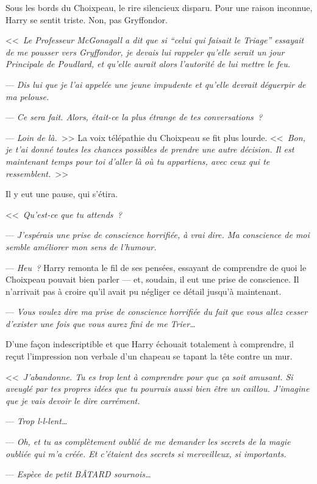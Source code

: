 Sous les bords du Choixpeau, le rire silencieux disparu. Pour une raison inconnue, Harry se sentit triste. Non, pas Gryffondor.

<<~\emph{Le Professeur McGonagall a dit que si “celui qui faisait le Triage” essayait de me pousser vers Gryffondor, je devais lui rappeler qu'elle serait un jour Principale de Poudlard, et qu'elle aurait alors l'autorité de lui mettre le feu.}

--- \emph{Dis lui que je l'ai appelée une jeune impudente et qu'elle devrait déguerpir de ma pelouse.}

--- \emph{Ce sera fait. Alors, était-ce la plus étrange de tes conversations~?}

--- \emph{Loin de là.}~>> La voix télépathie du Choixpeau se fit plus lourde. <<~\emph{Bon, je t'ai donné toutes les chances possibles de prendre une autre décision. Il est maintenant temps pour toi d'aller là où tu appartiens, avec ceux qui te ressemblent.}~>>

Il y eut une pause, qui s'étira.

<<~\emph{Qu'est-ce que tu attends~?}

--- \emph{J'espérais une prise de conscience horrifiée, à vrai dire. Ma conscience de moi semble améliorer mon sens de l'humour.}

--- \emph{Heu~?} Harry remonta le fil de ses pensées, essayant de comprendre de quoi le Choixpeau pouvait bien parler — et, soudain, il eut une prise de conscience. Il n'arrivait pas à croire qu'il avait pu négliger ce détail jusqu'à maintenant.

--- \emph{Vous voulez dire ma prise de conscience horrifiée du fait que vous allez cesser d'exister une fois que vous aurez fini de me Trier…}

D'une façon indescriptible et que Harry échouait totalement à comprendre, il reçut l'impression non verbale d'un chapeau se tapant la tête contre un mur.

<<~\emph{J'abandonne. Tu es trop lent à comprendre pour que ça soit amusant. Si aveuglé par tes propres idées que tu pourrais aussi bien être un caillou. J'imagine que je vais devoir le dire carrément.}

--- \emph{Trop l-l-lent…}

--- \emph{Oh, et tu as complètement oublié de me demander les secrets de la magie oubliée qui m'a créée. Et c'étaient des secrets si merveilleux, si importants.}

--- \emph{Espèce de petit BÂTARD sournois…}

